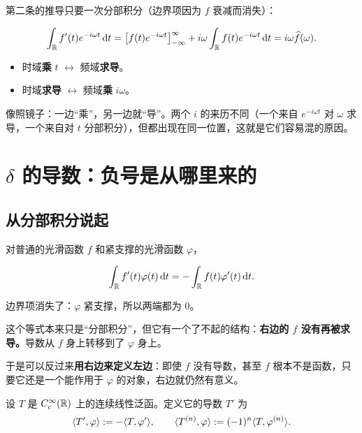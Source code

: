 第二条的推导只要一次分部积分（边界项因为 $f$ 衰减而消失）：

\begin{equation}
\int_{\mathbb{R}}f'(t)e^{-i\omega t}\mathop{}\!\mathrm{d} t
=\big[f(t)e^{-i\omega t}\big]_{-\infty}^{\infty}
+i\omega\int_{\mathbb{R}}f(t)e^{-i\omega t}\mathop{}\!\mathrm{d} t
=i\omega\widehat{f}(\omega).
\end{equation}

\begin{notebox}[一个帮助记忆的对照]
\begin{itemize}[leftmargin=1.4em,itemsep=0.2em]
\item 时域\textbf{乘} $t$ $\longleftrightarrow$ 频域\textbf{求导}。
\item 时域\textbf{求导} $\longleftrightarrow$ 频域\textbf{乘} $i\omega$。
\end{itemize}
像照镜子：一边“乘”，另一边就“导”。两个 $i$ 的来历不同（一个来自 $e^{-i\omega t}$ 对 $\omega$ 求导，一个来自对 $t$ 分部积分），但都出现在同一位置，这就是它们容易混的原因。
\end{notebox}

\section{$\delta$ 的导数：负号是从哪里来的}

\subsection{从分部积分说起}

对普通的光滑函数 $f$ 和紧支撑的光滑函数 $\varphi$，

\begin{equation}
\int_{\mathbb{R}}f'(t)\varphi(t)\mathop{}\!\mathrm{d} t
=-\int_{\mathbb{R}}f(t)\varphi'(t)\mathop{}\!\mathrm{d} t .\label{eq:ibp}
\end{equation}

边界项消失了：$\varphi$ 紧支撑，所以两端都为 $0$。

这个等式本来只是“分部积分”，但它有一个了不起的结构：\textbf{右边的 $f$ 没有再被求导。}导数从 $f$ 身上转移到了 $\varphi$ 身上。

于是可以反过来\textbf{用右边来定义左边}：即使 $f$ 没有导数，甚至 $f$ 根本不是函数，只要它还是一个能作用于 $\varphi$ 的对象，右边就仍然有意义。

\begin{defn}[分布导数]\label{def:dist-deriv}
设 $T$ 是 $C_c^{\infty}(\mathbb{R})$ 上的连续线性泛函。定义它的导数 $T'$ 为
\begin{equation}
\langle T',\varphi\rangle:=-\langle T,\varphi'\rangle,
\qquad
\langle T^{(n)},\varphi\rangle:=(-1)^{n}\langle T,\varphi^{(n)}\rangle .
\end{equation}
\end{defn}

